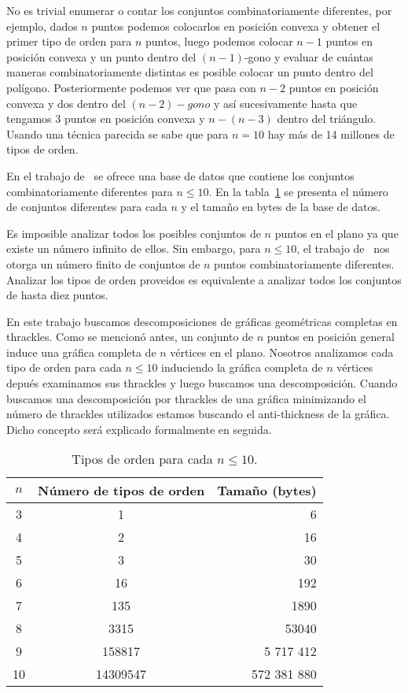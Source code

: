 No es trivial enumerar o contar los conjuntos combinatoriamente diferentes, por ejemplo,
dados $n$ puntos podemos colocarlos en posición convexa y obtener el primer tipo de orden
para $n$ puntos, luego podemos colocar $n-1$ puntos en posición convexa y un punto dentro
del $(n-1)$-gono y evaluar de cuántas maneras combinatoriamente distintas es posible colocar
un punto dentro del polígono. Posteriormente podemos ver que pasa con $n-2$ puntos
en posición convexa y dos dentro del $(n-2)-gono$ y así sucesivamente hasta que tengamos 3 puntos en posición
convexa y $n-(n-3)$ dentro del triángulo. Usando una técnica parecida se sabe que para $n=10$
hay más de 14 millones de tipos de orden.

En el trabajo de~\cite{Aichholzer2002} se ofrece una base de datos que contiene los conjuntos
combinatoriamente diferentes para $n\leq 10$. En la tabla~\ref{tab:ots} se presenta el número
de conjuntos diferentes para cada $n$ y el tamaño en bytes de la base de datos.

Es imposible analizar todos los posibles conjuntos de $n$ puntos en el plano
ya que existe un número infinito de ellos. Sin embargo, para $n\leq 10$, el trabajo de~\cite{Aichholzer2002}
nos otorga un número finito de conjuntos de $n$ puntos combinatoriamente diferentes.
Analizar los tipos de orden proveidos es equivalente a analizar todos los conjuntos de hasta diez puntos.

En este trabajo buscamos descomposiciones de gráficas geométricas completas en thrackles.
Como se mencionó antes, un conjunto de $n$ puntos en posición general
induce una gráfica completa de $n$ vértices en el plano. Nosotros analizamos
cada tipo de orden para cada $n\leq 10$ induciendo la gráfica completa de $n$ vértices depués
examinamos sus thrackles y luego buscamos una descomposición. Cuando buscamos
una descomposición por thrackles de una gráfica minimizando el número de thrackles utilizados
estamos buscando el anti-thickness de la gráfica. Dicho concepto será explicado
formalmente en seguida.
\begin{table}[ht]
  \centering
  \begin{tabular}{|c|c|r|}
  \hline
  $n$ & Número de tipos de orden & Tamaño (bytes)   \\ \hline
  3     & 1                   & 6       \\ \hline
  4     & 2                   & 16      \\ \hline
  5     & 3                   & 30      \\ \hline
  6     & 16                  & 192     \\ \hline
  7     & 135                 & 1890    \\ \hline
  8     & 3315                & 53040   \\ \hline
  9     & 158817              &	5 717 412   \\\hline
  10    & 14309547            & 572 381 880 \\ \hline
  \end{tabular}
  \caption{Tipos de orden para cada $n\leq10$.}
  \label{tab:ots}
\end{table}

